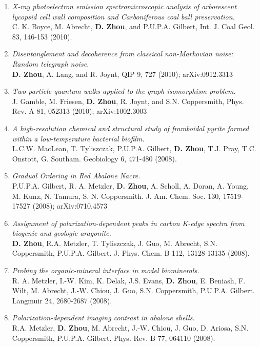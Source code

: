 \documentclass[centered,11pt,overlapped]{res}
\begin{document}
\begin{resume}
{\begin{enumerate}[leftmargin=-0.02in]
\item {\em X-ray photoelectron emission spectromicroscopic analysis of arborescent lycopsid cell wall composition and Carboniferous coal ball preservation.}\\
C. K. Boyce, M. Abrecht, {\bf D. Zhou}, and P.U.P.A. Gilbert, Int. J. Coal Geol. 83, 146-153 (2010).
\item {\em Disentanglement and decoherence from classical non-Markovian noise: Random telegraph noise.}\\
{\bf D. Zhou}, A. Lang, and R. Joynt, QIP 9, 727 (2010); arXiv:0912.3313
\item {\em Two-particle quantum walks applied to the graph isomorphism problem.} \\
J. Gamble, M. Friesen, {\bf D. Zhou}, R. Joynt, and S.N. Coppersmith, Phys. Rev. A 81, 052313 (2010); arXiv:1002.3003
\item {\em A high-resolution chemical and structural study of framboidal pyrite formed within a low-temperature bacterial biofilm.}\\
L.C.W. MacLean, T. Tyliszczak, P.U.P.A. Gilbert, {\bf D. Zhou}, T.J. Pray, T.C. Onstott, G. Southam.  Geobiology 6, 471-480 (2008).
\item {\em Gradual Ordering in Red Abalone Nacre.}\\
P.U.P.A. Gilbert, R. A. Metzler, {\bf D. Zhou}, A. Scholl, A. Doran, A. Young, M. Kunz, N. Tamura, S. N. Coppersmith. J. Am. Chem. Soc. 130, 17519-17527 (2008); arXiv:0710.4573
\item {\em Assignment of polarization-dependent peaks in carbon K-edge spectra from biogenic and geologic aragonite.}\\
{\bf D. Zhou}, R.A. Metzler, T. Tyliszczak, J. Guo, M. Abrecht, S.N. Coppersmith, P.U.P.A. Gilbert. J. Phys. Chem. B 112, 13128-13135 (2008).
\item {\em Probing the organic-mineral interface in model biominerals.}\\
R. A. Metzler, I.-W. Kim, K. Delak, J.S. Evans, {\bf D. Zhou}, E. Beniash, F. Wilt, M. Abrecht, J.-W. Chiou, J. Guo, S.N. Coppersmith, P.U.P.A. Gilbert.  Langmuir 24, 2680-2687 (2008).
\item {\em Polarization-dependent imaging contrast in abalone shells.}\\
R.A. Metzler, {\bf D. Zhou}, M. Abrecht, J.-W. Chiou, J. Guo, D. Ariosa, S.N. Coppersmith, P.U.P.A. Gilbert. Phys. Rev. B 77, 064110 (2008).
\end{enumerate}

}
\end{resume}
\end{document}
